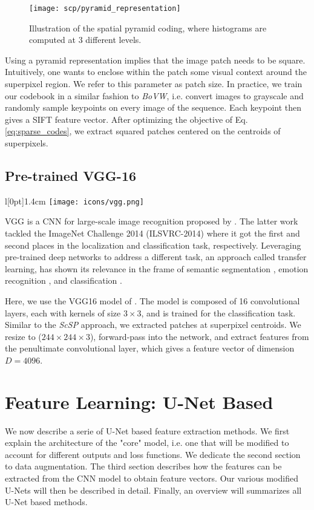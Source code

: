 \begin{figure}[htbp]
  \centering
  \texttt{[image: scp/pyramid\_representation]}
  \caption[Spatial pyramid representation]{Illustration of the spatial pyramid coding, where histograms are computed at 3 different levels.}
  \label{fig:pyramid_repr}
\end{figure}

Using a pyramid representation implies that the image patch needs to be square. Intuitively, one wants to enclose within the patch some visual context around the superpixel region.
We refer to this parameter as patch size.
In practice, we train our codebook in a similar fashion to \textit{BoVW}, i.e. convert images to grayscale and randomly sample keypoints on every image of the sequence.
Each keypoint then gives a SIFT feature vector.
After optimizing the objective of Eq. \ref{eq:sparse_codes}, we extract squared patches centered on the centroids of superpixels.

\subsection{Pre-trained VGG-16} \label{vgg}
\begingroup
\setlength\intextsep{0pt}
\begin{wrapfigure}[4]{l}[0pt]{1.4cm}
\texttt{[image: icons/vgg.png]}
\end{wrapfigure}

VGG is a CNN for large-scale image recognition proposed by \cite{simonyan15}.
The latter work tackled the ImageNet \cite{ILSVRC15} Challenge 2014 (ILSVRC-2014) where it got the first and second places in the localization and classification task, respectively.
Leveraging pre-trained deep networks to address a different task, an approach called transfer learning, has shown its relevance in the frame of semantic segmentation \cite{long15}, emotion recognition \cite{ng15}, and classification \cite{huynh16}.

\endgroup

Here, we use the VGG16 model of \cite[Tab. 1]{simonyan15}.
The model is composed of 16 convolutional layers, each with kernels of size $3 \times 3$, and is trained for the classification task.
Similar to the \textit{ScSP} approach, we extracted patches at superpixel centroids.
We resize to ($244 \times 244 \times 3$), forward-pass into the network, and extract features from the penultimate convolutional layer, which gives a feature vector of dimension $D=4096$.


\section{Feature Learning: U-Net Based} \label{ch:unet_based}
We now describe a serie of U-Net based feature extraction methods.
We first explain the architecture of the "core" model, i.e. one that will be modified to account for different outputs and loss functions.
We dedicate the second section to data augmentation.
The third section describes how the features can be extracted from the CNN model to obtain feature vectors.
Our various modified U-Nets will then be described in detail.
Finally, an overview will summarizes all U-Net based methods.

